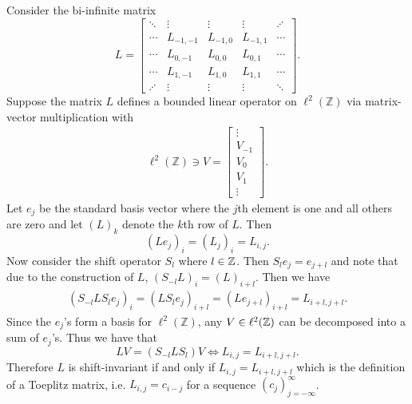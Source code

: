 \documentclass[12pt]{report}
\begin{document}
\begin{solution}

    \noindent
    Consider the bi-infinite matrix
    \[ 
      L = \begin{bmatrix}
        \ddots & \vdots & \vdots & \vdots  & \iddots \\
        \cdots & L_{-1,-1} & L_{-1,0} & L_{-1,1} & \cdots \\
        \cdots & L_{0,-1} & L_{0,0} & L_{0,1} & \cdots \\
        \cdots & L_{1,-1} & L_{1,0} & L_{1,1} & \cdots \\
        \iddots & \vdots & \vdots & \vdots & \ddots
      \end{bmatrix}.
    \]
    Suppose the matrix $L$ defines a bounded linear operator on $\ell^2(\mathbb Z)$ via matrix-vector multiplication with
    \begin{align*}
     \ell^2(\mathbb Z) \ni V = \begin{bmatrix} \vdots \\ V_{-1} \\ V_0 \\ V_1 \\\vdots \end{bmatrix}.
    \end{align*}
    Let $e_j$ be the standard basis vector where the $j$th element is one and all others are zero and let $(L)_k$ denote the $k$th row of $L$. Then
    \[ 
      (Le_j)_i = (L_j)_i = L_{i,j}.
    \]
    Now consider the shift operator $S_l$ where $l \in {\mathbb Z}$. Then $S_l e_j = e_{j+l}$ and note that due to the construction of $L$, $(S_{-l}L)_i = (L)_{i+l}$. Then we have
    \begin{align*}
      (S_{-l}LS_le_j)_i = (LS_le_j)_{i+l} = (Le_{j+l})_{i+l} = L_{i+l,j+l}. 
    \end{align*}
    Since the $e_j$'s form a basis for $\ell^2(\mathbb Z)$, any $V \in \ell^2({\mathbb Z})$ can be decomposed into a sum of $e_j$'s. Thus we have that 
    \[ 
      LV = (S_{-l}LS_{l})V \iff L_{i,j} = L_{i+l,j+l}. 
    \]  
    Therefore $L$ is shift-invariant if and only if $L_{i,j} = L_{i+l,j+l}$ which is the definition of a Toeplitz matrix, i.e. $L_{i,j} = c_{i-j}$ for a sequence $(c_j)^\infty_{j=-\infty}$.



\end{solution}

\newpage
\end{document}
